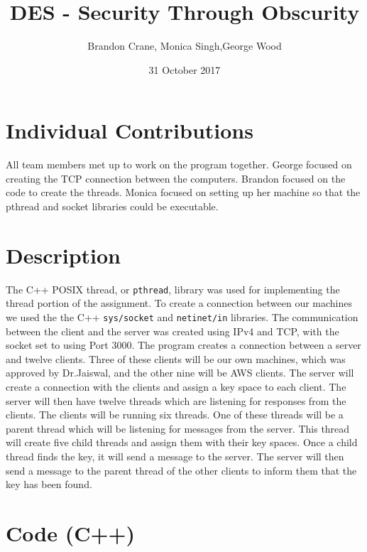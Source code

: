 \documentclass[11pt]{article}
\title{DES - Security Through Obscurity}
\author{Brandon Crane, Monica Singh,George Wood}
\date{31 October 2017}
\begin{document}
\maketitle

\thispagestyle{empty}

\section{Individual Contributions}
All team members met up to work on the program together. George focused on creating the TCP connection between the computers. Brandon focused on the code to create the threads.
Monica focused on setting up her machine so that the pthread and socket libraries
could be executable.

\section{Description}
The C++ POSIX thread, or \texttt{pthread}, library was used for implementing the thread portion of the assignment. To create a connection between our machines we used the the C++ \texttt{sys/socket} and  \texttt{netinet/in}  libraries. The communication between the client and the server was created using IPv4 and TCP, with the socket set to using Port 3000. The program creates a connection between a server and twelve clients. Three of these clients will be our own machines, which was approved by Dr.Jaiswal, and the other nine will be AWS clients. The server will create a connection with the clients and assign a key space to each client. The server will then have twelve threads which are listening for responses from the clients. The clients will be running six threads. One of these threads will be a parent thread which will be listening for messages from the server. This thread will create five child threads and assign them with their key spaces. Once a child thread finds the key, it will send a message to the server. The server will then send a message to the parent thread of the other clients to inform them that the key has been found.


\section{Code (C++)}
\begin{verbatim}

\end{verbatim}
\end{document}
